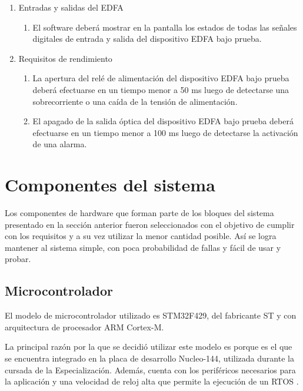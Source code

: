 \begin{enumerate}
\item Entradas y salidas del EDFA
	\begin{enumerate}
	\item El software deberá mostrar en la pantalla los estados de todas las señales digitales de entrada y salida del dispositivo EDFA bajo prueba.
	\end{enumerate}

\item Requisitos de rendimiento
	\begin{enumerate}
	\item La apertura del relé de alimentación del dispositivo EDFA 		bajo prueba deberá efectuarse en un tiempo menor a 50 ms luego de 		detectarse una sobrecorriente o una caída de la tensión de 				alimentación.
	\item El apagado de la salida óptica del dispositivo EDFA bajo 			prueba deberá efectuarse en un tiempo menor a 100 ms luego de 			detectarse la activación de una alarma.
	\end{enumerate}
	
\end{enumerate}

\section{Componentes del sistema}

Los componentes de hardware que forman parte de los bloques del sistema presentado en la sección anterior fueron seleccionados con el objetivo de cumplir con los requisitos y a su vez utilizar la menor cantidad posible. Así se logra mantener al sistema simple, con poca probabilidad de fallas y fácil de usar y probar.

\subsection{Microcontrolador}

El modelo de microcontrolador utilizado es STM32F429, del fabricante ST y con arquitectura de procesador ARM Cortex-M.

La principal razón por la que se decidió utilizar este modelo es porque es el que se encuentra integrado en la placa de desarrollo Nucleo-144, utilizada durante la cursada de la Especialización. Además, cuenta con los periféricos necesarios para la aplicación y una velocidad de reloj alta que permite la ejecución de un RTOS \citep{STM32F429}.



